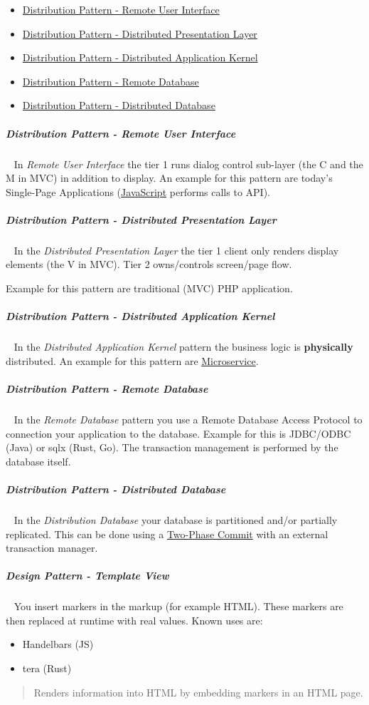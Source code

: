 \documentclass[11pt,twoside,landscape]{article}
\begin{document}
\begin{multicols}{3}
\begin{itemize}
\item \href{../../../roam/20230107150231-distribution_pattern_remote_user_interface.org}{Distribution Pattern - Remote User Interface}
\item \href{../../../roam/20230107150503-distribution_pattern_distributed_presentation_layer.org}{Distribution Pattern - Distributed Presentation Layer}
\item \href{../../../roam/20230107150808-distribution_pattern_distributed_application_kernel.org}{Distribution Pattern - Distributed Application Kernel}
\item \href{../../../roam/20230107151100-distribution_pattern_remote_database.org}{Distribution Pattern - Remote Database}
\item \href{../../../roam/20230107151436-distribution_pattern_distributed_database.org}{Distribution Pattern - Distributed Database}
\end{itemize}
\subparagraph{Distribution Pattern - Remote User Interface} \
\label{sec:orga843b0b}
In \emph{Remote User Interface} the tier 1 runs dialog control sub-layer (the C and the M in MVC) in addition to display.
An example for this pattern are today's Single-Page Applications (\href{../../../roam/20220513105545-javascript.org}{JavaScript} performs calls to API).
\subparagraph{Distribution Pattern - Distributed Presentation Layer} \
\label{sec:org8c582a8}
In the \emph{Distributed Presentation Layer} the tier 1 client only renders display elements (the V in MVC).
Tier 2 owns/controls screen/page flow.

Example for this pattern are traditional (MVC) PHP application.
\subparagraph{Distribution Pattern - Distributed Application Kernel} \
\label{sec:org346330b}
In the \emph{Distributed Application Kernel} pattern the business logic is \textbf{physically} distributed.
An example for this pattern are \href{../../../roam/20230107150950-what_are_microservices.org}{Microservice}.
\subparagraph{Distribution Pattern - Remote Database} \
\label{sec:org505aa89}
In the \emph{Remote Database} pattern you use a Remote Database Access Protocol to connection your application to the database.
Example for this is JDBC/ODBC (Java) or sqlx (Rust, Go).
The transaction management is performed by the database itself.
\subparagraph{Distribution Pattern - Distributed Database} \
\label{sec:org77c1a64}
In the \emph{Distribution Database} your database is partitioned and/or partially replicated.
This can be done using a \href{../../../roam/20230107151606-what_is_a_two_phase_commit.org}{Two-Phase Commit} with an external transaction manager.
\subparagraph{Design Pattern - Template View} \
\label{sec:org1ed55ea}
You insert markers in the markup (for example HTML).
These markers are then replaced at runtime with real values.
Known uses are:
\begin{itemize}
\item Handelbars (JS)
\item tera (Rust)
\end{itemize}

\begin{quote}
Renders information into HTML by embedding markers in an HTML page.
\end{quote}
\end{multicols}
\end{document}
